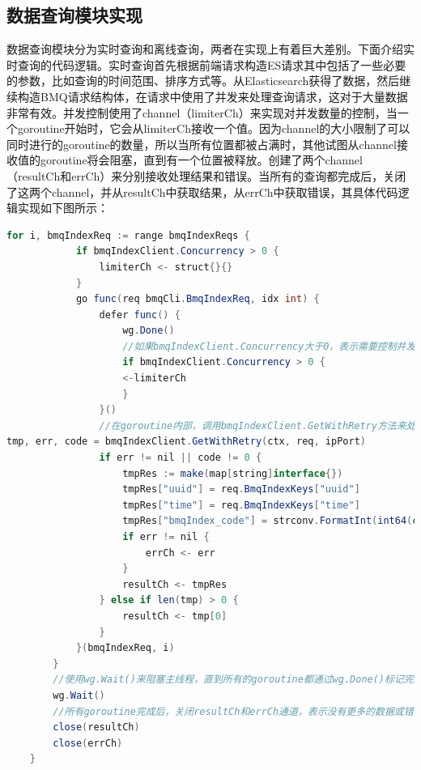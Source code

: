 \begin{longtable}[htbp]
\section{数据查询模块实现}

数据查询模块分为实时查询和离线查询，两者在实现上有着巨大差别。下面介绍实时查询的代码逻辑。实时查询首先根据前端请求构造ES请求其中包括了一些必要的参数，比如查询的时间范围、排序方式等。从Elasticsearch获得了数据，然后继续构造BMQ请求结构体，在请求中使用了并发来处理查询请求，这对于大量数据非常有效。并发控制使用了channel（limiterCh）来实现对并发数量的控制，当一个goroutine开始时，它会从limiterCh接收一个值。因为channel的大小限制了可以同时进行的goroutine的数量，所以当所有位置都被占满时，其他试图从channel接收值的goroutine将会阻塞，直到有一个位置被释放。创建了两个channel（resultCh和errCh）来分别接收处理结果和错误。当所有的查询都完成后，关闭了这两个channel，并从resultCh中获取结果，从errCh中获取错误，其具体代码逻辑实现如下图所示：

\begin{lrbox}{\realSearchchuli}  
\begin{lstlisting}[language=Java]  
for i, bmqIndexReq := range bmqIndexReqs {
            if bmqIndexClient.Concurrency > 0 {
                limiterCh <- struct{}{}
            }
            go func(req bmqCli.BmqIndexReq, idx int) {
                defer func() {
                    wg.Done()
                    //如果bmqIndexClient.Concurrency大于0，表示需要控制并发量
                    if bmqIndexClient.Concurrency > 0 {
                    <-limiterCh
                    }
                }()
                //在goroutine内部，调用bmqIndexClient.GetWithRetry方法来处理请求。这个方法可能会重试多次以确保请求成功。
tmp, err, code = bmqIndexClient.GetWithRetry(ctx, req, ipPort)
                if err != nil || code != 0 {
                    tmpRes := make(map[string]interface{})
                    tmpRes["uuid"] = req.BmqIndexKeys["uuid"]
                    tmpRes["time"] = req.BmqIndexKeys["time"]
                    tmpRes["bmqIndex_code"] = strconv.FormatInt(int64(code), 10)
                    if err != nil {
                        errCh <- err
                    }
                    resultCh <- tmpRes
                } else if len(tmp) > 0 {
                    resultCh <- tmp[0]
                }
            }(bmqIndexReq, i)
        }
        //使用wg.Wait()来阻塞主线程，直到所有的goroutine都通过wg.Done()标记完成为止。
        wg.Wait()
        //所有goroutine完成后，关闭resultCh和errCh通道，表示没有更多的数据或错误会被发送到这两个通道。
        close(resultCh)
        close(errCh)
    }
\end{lstlisting}  
\end{lrbox} 
\begin{table}[h]   
\caption{实时查询处理关键逻辑}  
\label{tab:realSearchchuli}  
\usebox{\realSearchchuli}  
\end{table}  


\end{longtable}
